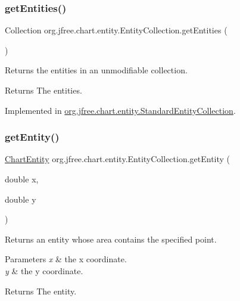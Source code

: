 \subsubsection{\texorpdfstring{get\+Entities()}{getEntities()}}
{\footnotesize\ttfamily Collection org.\+jfree.\+chart.\+entity.\+Entity\+Collection.\+get\+Entities (\begin{DoxyParamCaption}{ }\end{DoxyParamCaption})}

Returns the entities in an unmodifiable collection.

\begin{DoxyReturn}{Returns}
The entities. 
\end{DoxyReturn}


Implemented in \mbox{\hyperlink{classorg_1_1jfree_1_1chart_1_1entity_1_1_standard_entity_collection_a1f90d01a5346a42c64d91d129017b4da}{org.\+jfree.\+chart.\+entity.\+Standard\+Entity\+Collection}}.

\mbox{\label{interfaceorg_1_1jfree_1_1chart_1_1entity_1_1_entity_collection_a3bd10315f4cc926b0565e1fff221a1ec}} 
\subsubsection{\texorpdfstring{get\+Entity()}{getEntity()}\hspace{0.1cm}{\footnotesize\ttfamily [1/2]}}
{\footnotesize\ttfamily \mbox{\hyperlink{classorg_1_1jfree_1_1chart_1_1entity_1_1_chart_entity}{Chart\+Entity}} org.\+jfree.\+chart.\+entity.\+Entity\+Collection.\+get\+Entity (\begin{DoxyParamCaption}\item[{double}]{x,  }\item[{double}]{y }\end{DoxyParamCaption})}

Returns an entity whose area contains the specified point.


\begin{DoxyParams}{Parameters}
{\em x} & the x coordinate. \\
\hline
{\em y} & the y coordinate.\\
\hline
\end{DoxyParams}
\begin{DoxyReturn}{Returns}
The entity. 
\end{DoxyReturn}


